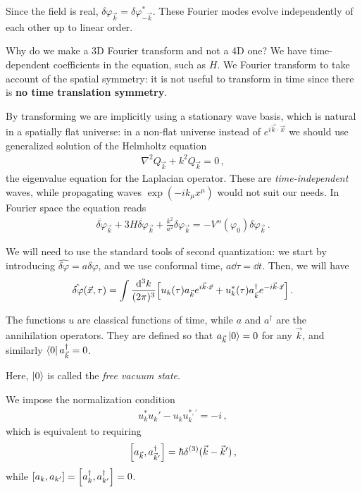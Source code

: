 \documentclass[main.tex]{subfiles}
\begin{document}
Since the field is real, \(\delta \varphi _{\vec{k}} = \delta \varphi _{- \vec{k}}^{*}\). 
These Fourier modes evolve independently of each other up to linear order. 

Why do we make a 3D Fourier transform and not a 4D one? We have time-dependent coefficients in the equation, such as \(H\). 
We Fourier transform to take account of the spatial symmetry: it is not useful to transform in time since there is \textbf{no time translation symmetry}. 

By transforming we are implicitly using a stationary wave basis, which is natural in a spatially flat universe: in a non-flat universe instead of \(e^{i \vec{k} \cdot \vec{x}}\) we should use generalized solution of the Helmholtz equation 
%
\begin{align}
\nabla^2 Q_{\vec{k}} + k^2 Q_{\vec{k}} = 0
\,,
\end{align}
%
the eigenvalue equation for the Laplacian operator. 
These are \emph{time-independent} waves, while propagating waves \(\exp(- i k_\mu x^{\mu })\) would not suit our needs. 
In Fourier space the equation reads 
%
\begin{align}
\ddot{ \delta \varphi} _{\vec{k}} + 3 H \dot{ \delta \varphi}_{\vec{k}}
+ \frac{k^2}{a^2} \delta \varphi _{\vec{k}} = - V'' (\varphi_0 ) \delta \varphi _{\vec{k}}
\,.
\end{align}

We will need to use the standard tools of second quantization: we start by introducing \(\hat{ \delta \varphi} = a \delta \varphi \), and we use conformal time, \(a \dd{ \tau } = \dd{t}\). Then, we will have 
%
\begin{align}
\hat{\delta \varphi} (\vec{x}, \tau ) = \int \frac{ \dd[3]{k}}{(2 \pi)^3}
\qty[u_k (\tau ) a_{\vec{k}} e^{i \vec{k} \cdot \vec{x}} + u_k^{*} (\tau ) a_{\vec{k}}^\dag e^{-i \vec{k} \cdot \vec{x}}] 
\,.
\end{align}

The functions \(u\) are classical functions of time, while \(a\) and \(a ^\dag \) are the annihilation operators.
They are defined so that \(a_{\vec{k}} \ket{0} = 0\) for any \(\vec{k}\), and similarly \(\bra{0} a ^\dag_{\vec{k}} = 0\). 

Here, \(\ket{0}\) is called the \emph{free vacuum state}.

We impose the normalization condition 
%
\begin{align}
u_k^{*} u_k' - u_k u_k^{*, \prime} = -i
\,,
\end{align}
%
which is equivalent to requiring 
%
\begin{align}
\qty[a_{\vec{k}}, a_{\vec{k}'} ^\dag] = \hbar \delta^{(3)} (\vec{k} - \vec{k}')
\,,
\end{align}
%
while \(\qty[a_k, a_{k'}] = \qty[a_k ^\dag, a_{k'}^\dag] = 0\). 
\end{document}
